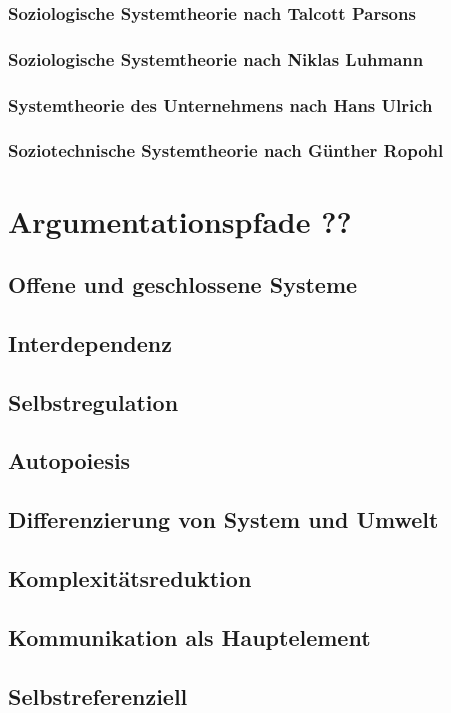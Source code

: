 \documentclass[a4paper,12pt]{article}
\begin{document}
\subsubsection{Soziologische Systemtheorie nach Talcott Parsons}
\subsubsection{Soziologische Systemtheorie nach Niklas Luhmann}
\subsubsection{Systemtheorie des Unternehmens nach Hans Ulrich}
\subsubsection{Soziotechnische Systemtheorie nach Günther Ropohl}

\section{Argumentationspfade ??}
\subsection{Offene und geschlossene Systeme}
\subsection{Interdependenz}
\subsection{Selbstregulation}
\subsection{Autopoiesis}
\subsection{Differenzierung von System und Umwelt}
\subsection{Komplexitätsreduktion}
\subsection{Kommunikation als Hauptelement}
\subsection{Selbstreferenziell}
\end{document}
